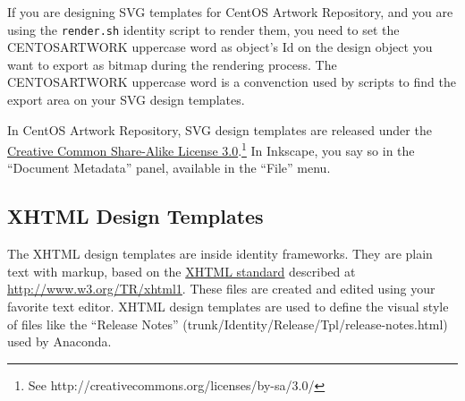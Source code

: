 If you are designing SVG templates for CentOS Artwork Repository, and
you are using the \texttt{render.sh} identity script to render them,
you need to set the CENTOSARTWORK uppercase word as object's Id on the
design object you want to export as bitmap during the rendering
process. The CENTOSARTWORK uppercase word is a convenction used by
scripts to find the export area on your SVG design templates.

In CentOS Artwork Repository, SVG design templates are released under
the \href{http://creativecommons.org/licenses/by-sa/3.0/}{Creative
Common Share-Alike License 3.0}.\footnote{See
http://creativecommons.org/licenses/by-sa/3.0/} In Inkscape, you say
so in the ``Document Metadata'' panel, available in the ``File'' menu.

\subsection{XHTML Design Templates} 

The XHTML design templates are inside identity frameworks. They are
plain text with markup, based on the
\href{http://www.w3.org/TR/xhtml1}{XHTML standard} described at
\href{http://www.w3.org/TR/xhtml1}{http://www.w3.org/TR/xhtml1}. These
files are created and edited using your favorite text editor.  XHTML
design templates are used to define the visual style of files like the
``Release Notes'' (trunk/Identity/Release/Tpl/release-notes.html) used
by Anaconda.


